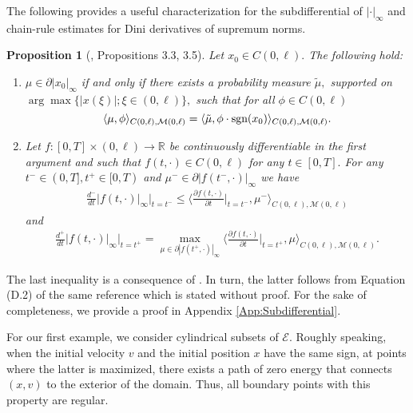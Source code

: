 \documentclass[10pt, reqno]{amsart}
\newcommand{\R}{\mathbb{R}}
\newcommand{\e}{\mathcal{E}}
\newtheorem{prop}{Proposition}
\theoremstyle{definition}
\numberwithin{lem}{section}
\numberwithin{cor}{section}
\numberwithin{prop}{section}
\numberwithin{thm}{section}
\numberwithin{dfn}{section}
\begin{document}
The following provides a useful characterization for the subdifferential of $|\cdot|_\infty$ and 
chain-rule estimates for Dini derivatives of supremum norms.
 \begin{prop}[\cite{salins2021existence}, Propositions 3.3, 3.5]\label{prop:subdifferential} Let $x_0\in C(0,\ell).$ The following hold:
 \begin{enumerate}
     \item $\mu\in \partial |x_0|_\infty$ if and only if there exists a probability measure $\tilde{\mu},$ supported on $\arg\max\{ |x(\xi)| ; \xi\in (0,\ell)\},$ such that for all $\phi\in C(0,\ell)$
 $$  \langle \mu, \phi \rangle_{C(0,\ell), \mathcal{M}(0,\ell) } = \langle \tilde{\mu}, \phi\cdot\textnormal{sgn}(x_0)\rangle_{C(0,\ell), \mathcal{M}(0,\ell) }.$$    
 \item Let $f:[0, T]\times (0, \ell)\rightarrow\R$ be continuously differentiable in the first argument and such that $f(t,\cdot)\in C(0,\ell) $ for any $t\in[0,T].$ For any $t^-\in(0, T], t^+\in[0, T)$ and $\mu^-\in\partial|f(t^-, \cdot )|_{\infty}$  we have 
  \begin{equation*}
     \begin{aligned}
        \frac{d^-}{dt}|f(t,\cdot)|_\infty\bigg|_{t=t^-}\leq\bigg\langle \frac{\partial f(t,\cdot)}{\partial t} \bigg|_{t=t^-}, \mu^-\bigg\rangle_{C(0,\ell), \mathcal{M}(0,\ell)}
     \end{aligned}
 \end{equation*}
 and 
 \begin{equation}\label{eq:rightDinibound}
     \begin{aligned}
        \frac{d^+}{dt}|f(t,\cdot)|_\infty\bigg|_{t=t^+}=\max_{\mu\in\partial|f(t^+, \cdot )|_\infty}\bigg\langle \frac{\partial f(t,\cdot)}{\partial t} \bigg|_{t=t^+}, \mu\bigg\rangle_{C(0,\ell), \mathcal{M}(0,\ell)}.
     \end{aligned}
 \end{equation}
 \end{enumerate}
 \end{prop}

 
 The last inequality is a consequence of \cite[Proposition D.4, Equation (D.5)]{da2014stochastic}. In turn, the latter follows from Equation (D.2) of the same reference which is stated without proof. For the sake of completeness, we provide a proof in Appendix \ref{App:Subdifferential}.


 For our first example, we consider cylindrical subsets of $\e.$ Roughly speaking, when the initial velocity $v$ and the initial position $x$ have the same sign, at points where the latter is maximized, there exists a path of zero energy that connects $(x,v)$ to the exterior of the domain. Thus, all boundary points with this property are regular.\\
\end{document}
